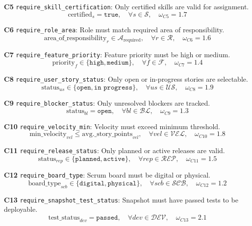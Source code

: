 \documentclass[12pt]{article}
\begin{document}
    \item[\textbf{C5}] \texttt{require\_skill\_certification}: Only certified skills are valid for assignment.
    \[
    \text{certified}_s = \texttt{true}, \quad \forall s \in \mathcal{S}, \quad \omega_{C5} = 1.7
    \]

    \item[\textbf{C6}] \texttt{require\_role\_area}: Role must match required area of responsibility.
    \[
    \text{area\_of\_responsibility}_r \in \mathcal{A}_{\text{required}}, \quad \forall r \in \mathcal{R}, \quad \omega_{C6} = 1.6
    \]

    \item[\textbf{C7}] \texttt{require\_feature\_priority}: Feature priority must be high or medium.
    \[
    \text{priority}_f \in \{\texttt{high}, \texttt{medium}\}, \quad \forall f \in \mathcal{F}, \quad \omega_{C7} = 1.4
    \]

    \item[\textbf{C8}] \texttt{require\_user\_story\_status}: Only open or in-progress stories are selectable.
    \[
    \text{status}_{us} \in \{\texttt{open}, \texttt{in progress}\}, \quad \forall us \in \mathcal{US}, \quad \omega_{C8} = 1.9
    \]

    \item[\textbf{C9}] \texttt{require\_blocker\_status}: Only unresolved blockers are tracked.
    \[
    \text{status}_{bl} = \texttt{open}, \quad \forall bl \in \mathcal{BL}, \quad \omega_{C9} = 1.3
    \]

    \item[\textbf{C10}] \texttt{require\_velocity\_min}: Velocity must exceed minimum threshold.
    \[
    \text{min\_velocity}_{vel} \leq \text{avg.\_story\_points}_{vel}, \quad \forall vel \in \mathcal{VEL}, \quad \omega_{C10} = 1.8
    \]

    \item[\textbf{C11}] \texttt{require\_release\_status}: Only planned or active releases are valid.
    \[
    \text{status}_{rep} \in \{\texttt{planned}, \texttt{active}\}, \quad \forall rep \in \mathcal{REP}, \quad \omega_{C11} = 1.5
    \]

    \item[\textbf{C12}] \texttt{require\_board\_type}: Scrum board must be digital or physical.
    \[
    \text{board\_type}_{scb} \in \{\texttt{digital}, \texttt{physical}\}, \quad \forall scb \in \mathcal{SCB}, \quad \omega_{C12} = 1.2
    \]

    \item[\textbf{C13}] \texttt{require\_snapshot\_test\_status}: Snapshot must have passed tests to be deployable.
    \[
    \text{test\_status}_{dev} = \texttt{passed}, \quad \forall dev \in \mathcal{DEV}, \quad \omega_{C13} = 2.1
    \]
\end{document}
